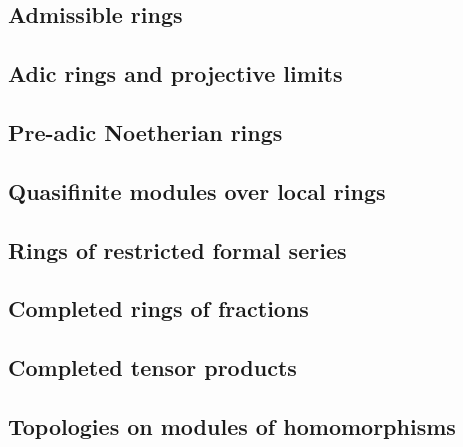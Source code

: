         \subsection{Admissible rings}
        \label{0-prelim-7.1}
        

        \subsection{Adic rings and projective limits}
        \label{0-prelim-7.2}
        

        \subsection{Pre-adic Noetherian rings}
        \label{0-prelim-7.3}
        

        \subsection{Quasifinite modules over local rings}
        \label{0-prelim-7.4}
        

        \subsection{Rings of restricted formal series}
        \label{0-prelim-7.5}
        

        \subsection{Completed rings of fractions}
        \label{0-prelim-7.6}
        

        \subsection{Completed tensor products}
        \label{0-prelim-7.7}
        

        \subsection{Topologies on modules of homomorphisms}
        \label{0-prelim-7.8}
        

